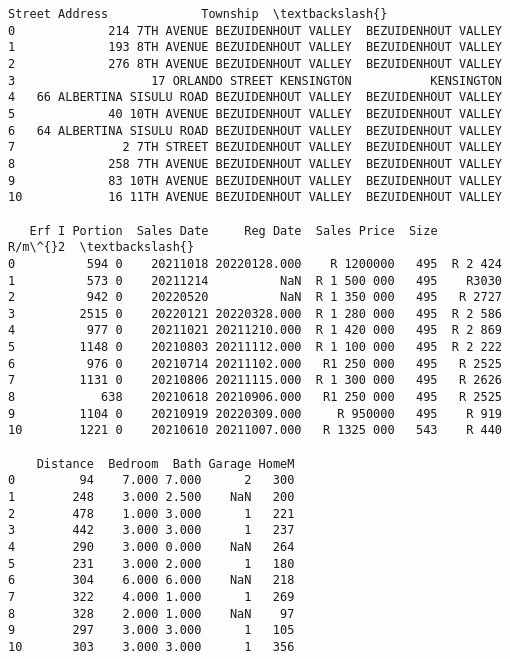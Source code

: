             \begin{tcolorbox}[breakable, size=fbox, boxrule=.5pt, pad at break*=1mm, opacityfill=0]
\begin{Verbatim}[commandchars=\\\{\}]
                                  Street Address             Township  \textbackslash{}
0             214 7TH AVENUE BEZUIDENHOUT VALLEY  BEZUIDENHOUT VALLEY
1             193 8TH AVENUE BEZUIDENHOUT VALLEY  BEZUIDENHOUT VALLEY
2             276 8TH AVENUE BEZUIDENHOUT VALLEY  BEZUIDENHOUT VALLEY
3                   17 ORLANDO STREET KENSINGTON           KENSINGTON
4   66 ALBERTINA SISULU ROAD BEZUIDENHOUT VALLEY  BEZUIDENHOUT VALLEY
5             40 10TH AVENUE BEZUIDENHOUT VALLEY  BEZUIDENHOUT VALLEY
6   64 ALBERTINA SISULU ROAD BEZUIDENHOUT VALLEY  BEZUIDENHOUT VALLEY
7               2 7TH STREET BEZUIDENHOUT VALLEY  BEZUIDENHOUT VALLEY
8             258 7TH AVENUE BEZUIDENHOUT VALLEY  BEZUIDENHOUT VALLEY
9             83 10TH AVENUE BEZUIDENHOUT VALLEY  BEZUIDENHOUT VALLEY
10            16 11TH AVENUE BEZUIDENHOUT VALLEY  BEZUIDENHOUT VALLEY

   Erf I Portion  Sales Date     Reg Date  Sales Price  Size    R/m\^{}2  \textbackslash{}
0          594 0    20211018 20220128.000    R 1200000   495  R 2 424
1          573 0    20211214          NaN  R 1 500 000   495    R3030
2          942 0    20220520          NaN  R 1 350 000   495   R 2727
3         2515 0    20220121 20220328.000  R 1 280 000   495  R 2 586
4          977 0    20211021 20211210.000  R 1 420 000   495  R 2 869
5         1148 0    20210803 20211112.000  R 1 100 000   495  R 2 222
6          976 0    20210714 20211102.000   R1 250 000   495   R 2525
7         1131 0    20210806 20211115.000  R 1 300 000   495   R 2626
8            638    20210618 20210906.000   R1 250 000   495   R 2525
9         1104 0    20210919 20220309.000     R 950000   495    R 919
10        1221 0    20210610 20211007.000   R 1325 000   543    R 440

    Distance  Bedroom  Bath Garage HomeM
0         94    7.000 7.000      2   300
1        248    3.000 2.500    NaN   200
2        478    1.000 3.000      1   221
3        442    3.000 3.000      1   237
4        290    3.000 0.000    NaN   264
5        231    3.000 2.000      1   180
6        304    6.000 6.000    NaN   218
7        322    4.000 1.000      1   269
8        328    2.000 1.000    NaN    97
9        297    3.000 3.000      1   105
10       303    3.000 3.000      1   356
\end{Verbatim}
\end{tcolorbox}
        
